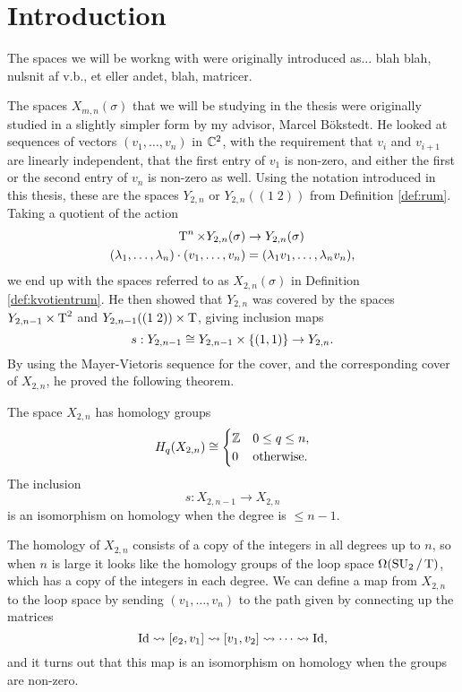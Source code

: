 \chapter{Introduction}


The spaces we will be workng with were originally introduced
as... blah blah, nulsnit af v.b., et eller andet, blah, matricer.


The spaces $X_{m,n}(\sigma)$ that we will be studying in the thesis
were originally studied in a slightly simpler form by my advisor,
Marcel B\"okstedt. He looked at sequences of vectors $(v_1,\dots,v_n)$
in $\mathbb{C}^2$, with the requirement that $v_i$ and $v_{i+1}$ are linearly
independent, that the first entry of $v_1$  is non-zero, and either
the first or the second entry of $v_n$ is non-zero as well. Using the
notation introduced in this thesis, these are the spaces $Y_{2,n}$ or
$Y_{2,n}((1\;2))$ from Definition \ref{def:rum}. Taking a quotient
of the action
\begin{align*}
  \operatorname{T}^n \times Y_{2,n}(\sigma) &\to Y_{2,n}(\sigma) \\
  (\lambda_1,\dots,\lambda_n)\cdot (v_1,\dots,v_n) &= (\lambda_1v_1,\dots,\lambda_nv_n),
\end{align*}
we end up with the spaces referred to as $X_{2,n}(\sigma)$ in
Definition \ref{def:kvotientrum}. He then showed that $Y_{2,n}$ was
covered by the spaces $Y_{2,n-1}\times\operatorname{T}^2$ and $Y_{2,n-1}((1\; 2))\times
\operatorname{T}$, giving inclusion maps
\[ s : Y_{2,n-1} \cong Y_{2,n-1}\times\left\{ (1,1) \right\} \to Y_{2,n}. \]
By using the Mayer-Vietoris sequence for the cover, and the
corresponding cover of $X_{2,n}$, he proved the
following theorem.
\begin{theorem}
  The space $X_{2,n}$ has homology groups
  \[ H_q(X_{2,n}) \cong
  \begin{cases}
    \mathbb{Z} & 0 \leq q \leq n, \\
    0 & \text{otherwise.}
  \end{cases} \]
  The inclusion
  \[ s : X_{2,n-1} \to X_{2,n} \]
  is an isomorphism on homology when the degree is $\leq n-1$.
\end{theorem}

The homology of $X_{2,n}$ consists of a copy of the integers in all
degrees up to $n$, so when $n$ is large it looks like the homology
groups of the loop space
$\Omega(\operatorname{SU}_2/\operatorname{T})$, which has a copy of the integers in each
degree. We can define a map from $X_{2,n}$ to the loop space
by sending $(v_1,\dots,v_n)$ to
the path given by connecting up the matrices
\[ \operatorname{Id} \leadsto [e_2,v_1] \leadsto [v_1,v_2] \leadsto \dots \leadsto
\operatorname{Id}, \]
and it turns out that this map is an isomorphism on homology when the
groups are non-zero.

